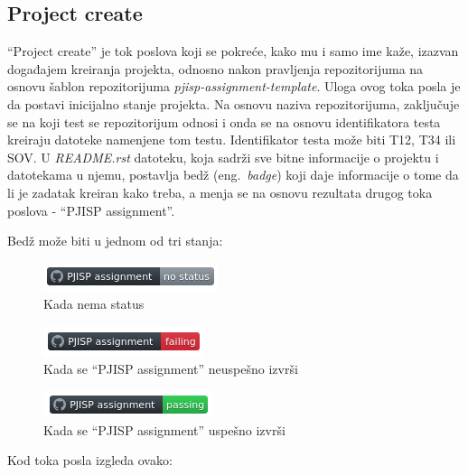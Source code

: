 \documentclass[12pt]{report}
\begin{document}
\subsection{Project create}
``Project create'' je tok poslova koji se pokreće, kako mu i samo ime kaže, izazvan događajem kreiranja projekta, odnosno nakon pravljenja repozitorijuma na osnovu šablon repozitorijuma \textit{pjisp-assignment-template}. Uloga ovog toka posla je da postavi inicijalno stanje projekta. Na osnovu naziva repozitorijuma, zaključuje se na koji test se repozitorijum odnosi i onda se na osnovu identifikatora testa kreiraju datoteke namenjene tom testu. Identifikator testa može biti T12, T34 ili SOV. U \textit{README.rst} datoteku, koja sadrži sve bitne informacije o projektu i datotekama u njemu, postavlja bedž (eng.\ \textit{badge}) koji daje informacije o tome da li je zadatak kreiran kako treba, a menja se na osnovu rezultata drugog toka poslova - ``PJISP assignment''.

Bedž može biti u jednom od tri stanja:

\begin{figure}[H]
    \centering
    \includegraphics{images/nostatus.png}
    \caption{Kada nema status}
\end{figure}

\begin{figure}[H]
    \centering
    \includegraphics{images/failing.png}
    \caption{Kada se ``PJISP assignment'' neuspešno izvrši}
\end{figure}

\begin{figure}[H]
    \centering
    \includegraphics{images/passing.png}
    \caption{Kada se ``PJISP assignment'' uspešno izvrši}
\end{figure}

Kod toka posla izgleda ovako:
\end{document}
